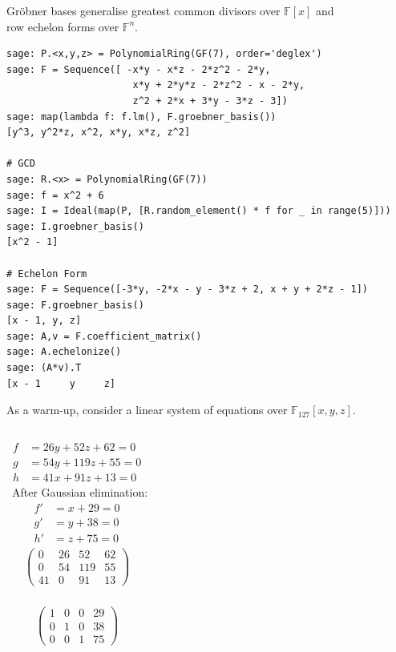\documentclass[9pt]{beamer}
\newcommand{\field}[1]{\ensuremath{\mathbb{#1}}}
\begin{document}
\begin{frame}
\framebreak

Gröbner bases generalise greatest common divisors over $\field{F}[x]$ and\\row echelon forms over $\field{F}^n$.

\begin{lstlisting}
sage: P.<x,y,z> = PolynomialRing(GF(7), order='deglex')
sage: F = Sequence([ -x*y - x*z - 2*z^2 - 2*y,  
                      x*y + 2*y*z - 2*z^2 - x - 2*y,  
                      z^2 + 2*x + 3*y - 3*z - 3])
sage: map(lambda f: f.lm(), F.groebner_basis())
[y^3, y^2*z, x^2, x*y, x*z, z^2]

# GCD
sage: R.<x> = PolynomialRing(GF(7))
sage: f = x^2 + 6
sage: I = Ideal(map(P, [R.random_element() * f for _ in range(5)]))
sage: I.groebner_basis()
[x^2 - 1]

# Echelon Form
sage: F = Sequence([-3*y, -2*x - y - 3*z + 2, x + y + 2*z - 1])
sage: F.groebner_basis()
[x - 1, y, z]
sage: A,v = F.coefficient_matrix()
sage: A.echelonize()
sage: (A*v).T
[x - 1     y     z]
\end{lstlisting}


\framebreak

As a warm-up, consider a linear system of equations over $\field{F}_{127}[x,y,z]$.

\begin{columns}
\begin{align*}
f &= 26y + 52z + 62 = 0\\
g &= 54y + 119z + 55 = 0\\
h &= 41x + 91z + 13 = 0
\end{align*}
\ After Gaussian elimination:
\begin{align*}
f' &= x + 29 = 0\\
g' &= y + 38 = 0\\
h' &= z + 75 = 0
\end{align*}
\begin{align*}
\left(\begin{array}{rrrr}
0 & 26 & 52 & 62 \\
0 & 54 & 119 & 55 \\
41 & 0 & 91 & 13
\end{array}\right)
\end{align*}
\ \\
\begin{align*}
\left(\begin{array}{rrrr}
1 & 0 & 0 & 29 \\
0 & 1 & 0 & 38 \\
0 & 0 & 1 & 75
\end{array}\right)
\end{align*}
\end{columns}


\end{frame}
\end{document}

